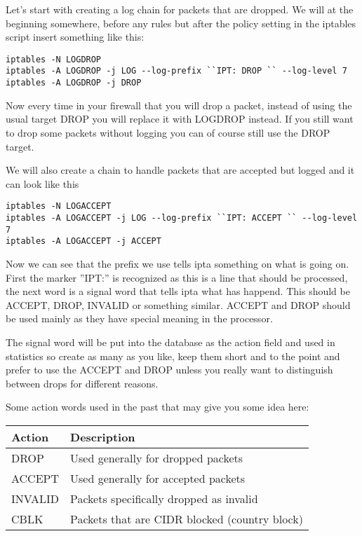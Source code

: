\documentclass[english,twoside,openright,a4paper,12pt]{article}
\begin{document}
Let's start with creating a log chain for packets that are dropped. We will at the beginning somewhere, before any rules but after the policy setting in the iptables script insert something like this:

\begin{verbatim}
iptables -N LOGDROP
iptables -A LOGDROP -j LOG --log-prefix ``IPT: DROP `` --log-level 7
iptables -A LOGDROP -j DROP
\end{verbatim}

Now every time in your firewall that you will drop a packet, instead of using the usual target DROP you will replace it with LOGDROP instead. If you still want to drop some packets without logging you can of course still use the DROP target.

We will also create a chain to handle packets that are accepted but logged and it can look like this

\small
\begin{verbatim}
iptables -N LOGACCEPT
iptables -A LOGACCEPT -j LOG --log-prefix ``IPT: ACCEPT `` --log-level 7
iptables -A LOGACCEPT -j ACCEPT
\end{verbatim}
\normalsize

Now we can see that the prefix we use tells ipta something on what is going on. First the marker ''IPT:'' is recognized as this is a line that should be processed, the next word is a signal word that tells ipta what has happend. This should be ACCEPT, DROP, INVALID or something similar. ACCEPT and DROP should be used mainly as they have special meaning in the processor.

The signal word will be put into the database as the action field and used in statistics so create as many as you like, keep them short and to the point and prefer to use the ACCEPT and DROP unless you really want to distinguish between drops for different reasons.

Some action words used in the past that may give you some idea here:

\begin{table}[H]
\begin{tabular}{ll}
	\textbf{Action} & \textbf{Description  }                        \\ \hline
	DROP            & Used generally for dropped packets            \\
	ACCEPT          & Used generally for accepted packets           \\
	INVALID         & Packets specifically dropped as invalid       \\
	CBLK            & Packets that are CIDR blocked (country block)
\end{tabular}
\end{table}
\end{document}

